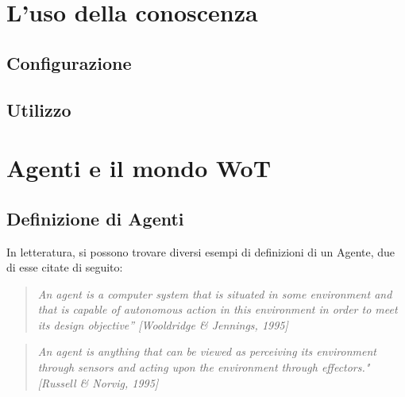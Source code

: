 \documentclass[12pt,a4paper,openright,oneside]{report}
\begin{document}
\clearpage{\pagestyle{empty}\cleardoublepage}
\chapter{L'uso della conoscenza}           %
\lhead[\fancyplain{}{\bfseries\thepage}]{\fancyplain{}{\bfseries\rightmark}}  

\section{Configurazione}

\section{Utilizzo}





\clearpage{\pagestyle{empty}\cleardoublepage}
\chapter{Agenti e il mondo WoT}           %
\lhead[\fancyplain{}{\bfseries\thepage}]{\fancyplain{}{\bfseries\rightmark}}  

\section{Definizione di Agenti}
In letteratura, si possono trovare diversi esempi di definizioni di un Agente, due di esse citate di seguito:

\begin{quotation}
	\textit{
	An agent is a computer system that is situated in some
	environment and that is capable of autonomous action in
	this environment in order to meet its design
	objective” [Wooldridge \& Jennings, 1995]}
\end{quotation}

\begin{quotation}
	\textit{
	An agent is anything that can be viewed as perceiving its
	environment through sensors and acting upon the
	environment through effectors." [Russell \& Norvig, 1995]}
\end{quotation}
\end{document}
